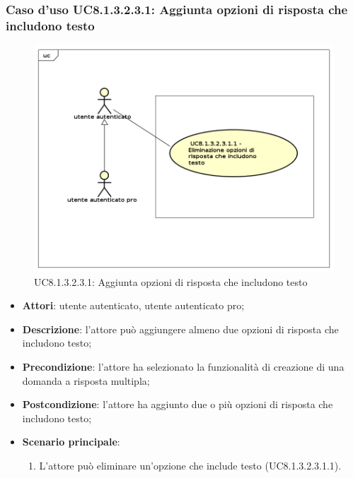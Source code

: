 \subsubsection{Caso d'uso UC8.1.3.2.3.1: Aggiunta opzioni di risposta che includono testo}
	\label{UC8.1.3.2.3.1}
	\begin{figure}[h]
		\centering
			\includegraphics[scale=0.45,keepaspectratio]{UML/UC8_1_3_2_3_1.png}
		\caption{UC8.1.3.2.3.1: Aggiunta opzioni di risposta che includono testo}
	\end{figure}	
	\FloatBarrier
	\begin{itemize}
		\item
			\textbf{Attori}: utente autenticato, utente autenticato pro;
		\item		
			\textbf{Descrizione}: l'attore può aggiungere almeno due opzioni di risposta che includono testo;
		\item
			\textbf{Precondizione}: l'attore ha selezionato la funzionalità di creazione di una domanda a risposta multipla;
		\item
			\textbf{Postcondizione}: l'attore ha aggiunto due o più opzioni di risposta che includono testo;
		\item
			\textbf{Scenario principale}: 
				\begin{enumerate}
					\item
						L'attore può eliminare un'opzione che include testo (UC8.1.3.2.3.1.1).				
				\end{enumerate}
	\end{itemize}	
	
